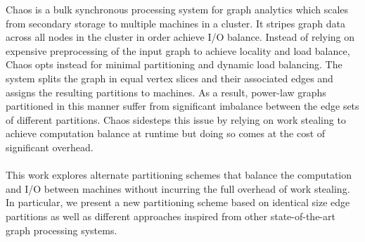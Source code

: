Chaos is a bulk synchronous processing system for graph analytics which scales from secondary storage to multiple machines in a cluster. It stripes graph data across all nodes in the cluster in order achieve I/O balance. Instead of relying on expensive preprocessing of the input graph to achieve locality and load balance, Chaos opts instead for minimal partitioning and dynamic load balancing. The system splits the graph in equal vertex slices and their associated edges and assigns the resulting partitions to machines. As a result, power-law graphs partitioned in this manner suffer from significant imbalance between the edge sets of different partitions. Chaos sidesteps this issue by relying on work stealing to achieve computation balance at runtime but doing so comes at the cost of significant overhead.\\\\
This work explores alternate partitioning schemes that balance the computation and I/O between machines without incurring the full overhead of work stealing. In particular, we present a new partitioning scheme based on identical size edge partitions as well as different approaches inspired from other state-of-the-art graph processing systems.